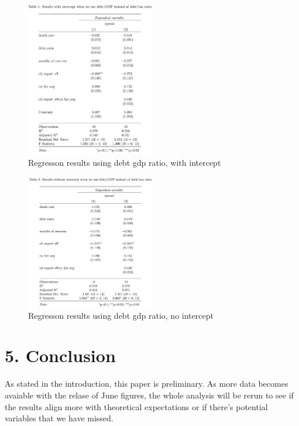 \documentclass[11pt,]{article}
\begin{document}
\begin{figure}
\centering
\includegraphics[width=0.5\textwidth,height=\textheight]{reportfigures/AFTER_Regression_outputs_when_using_debt_gdp_ratio_intercept.png}
\caption{Regresson results using debt gdp ratio, with intercept}
\end{figure}

\begin{figure}
\centering
\includegraphics[width=0.5\textwidth,height=\textheight]{reportfigures/AFTER_Regression_outputs_when_using_debt_gdp_ratio_nointercept.png}
\caption{Regresson results using debt gdp ratio, no intercept}
\end{figure}

\hypertarget{conclusion}{%
\section{5. Conclusion}\label{conclusion}}

As stated in the introduction, this paper is preliminary. As more data
becomes avaiable with the relase of June figures, the whole analysis
will be rerun to see if the results align more with theoretical
expectations or if there's potential variables that we have missed.

\newpage
\singlespacing 

\end{document}
